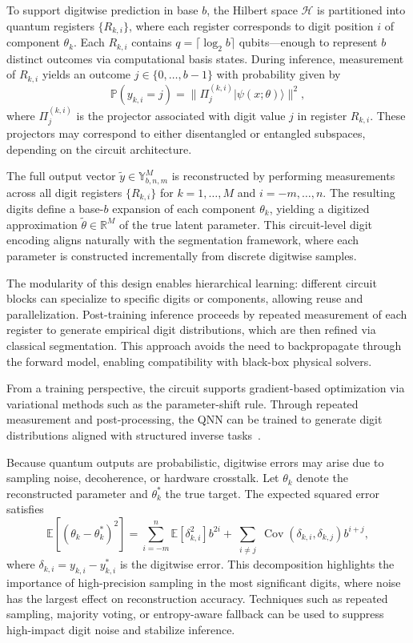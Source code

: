 \documentclass[aps,twocolumn,superscriptaddress,nofootinbib]{revtex4}
\begin{document}
To support digitwise prediction in base $b$, the Hilbert space $\mathcal{H}$ is partitioned into quantum registers $\{R_{k,i}\}$, where each register corresponds to digit position $i$ of component $\theta_k$. Each $R_{k,i}$ contains $q = \lceil \log_2 b \rceil$ qubits—enough to represent $b$ distinct outcomes via computational basis states. During inference, measurement of $R_{k,i}$ yields an outcome $j \in \{0, \ldots, b-1\}$ with probability given by
\begin{equation}
    \mathbb{P}(y_{k,i} = j) = \| \Pi_j^{(k,i)} |\psi(x; \theta)\rangle \|^2,
\end{equation}
where $\Pi_j^{(k,i)}$ is the projector associated with digit value $j$ in register $R_{k,i}$. These projectors may correspond to either disentangled or entangled subspaces, depending on the circuit architecture.

The full output vector $\tilde{y} \in \mathbb{Y}_{b,n,m}^M$ is reconstructed by performing measurements across all digit registers $\{R_{k,i}\}$ for $k = 1,\ldots,M$ and $i = -m,\ldots,n$. The resulting digits define a base-$b$ expansion of each component $\theta_k$, yielding a digitized approximation $\tilde{\theta} \in \mathbb{R}^M$ of the true latent parameter. This circuit-level digit encoding aligns naturally with the segmentation framework, where each parameter is constructed incrementally from discrete digitwise samples.

The modularity of this design enables hierarchical learning: different circuit blocks can specialize to specific digits or components, allowing reuse and parallelization. Post-training inference proceeds by repeated measurement of each register to generate empirical digit distributions, which are then refined via classical segmentation. This approach avoids the need to backpropagate through the forward model, enabling compatibility with black-box physical solvers.

From a training perspective, the circuit supports gradient-based optimization via variational methods such as the parameter-shift rule. Through repeated measurement and post-processing, the QNN can be trained to generate digit distributions aligned with structured inverse tasks~\cite{mitarai2018parameter}.

Because quantum outputs are probabilistic, digitwise errors may arise due to sampling noise, decoherence, or hardware crosstalk. Let $\theta_k$ denote the reconstructed parameter and $\theta_k^*$ the true target. The expected squared error satisfies
\begin{equation}
\mathbb{E}\left[(\theta_k - \theta_k^*)^2\right] = \sum_{i=-m}^{n} \mathbb{E}[\delta_{k,i}^2] b^{2i} + \sum_{\substack{i \neq j}} \operatorname{Cov}(\delta_{k,i}, \delta_{k,j}) b^{i+j},
\end{equation}
where $\delta_{k,i} = y_{k,i} - y^*_{k,i}$ is the digitwise error. This decomposition highlights the importance of high-precision sampling in the most significant digits, where noise has the largest effect on reconstruction accuracy. Techniques such as repeated sampling, majority voting, or entropy-aware fallback can be used to suppress high-impact digit noise and stabilize inference.
\end{document}
